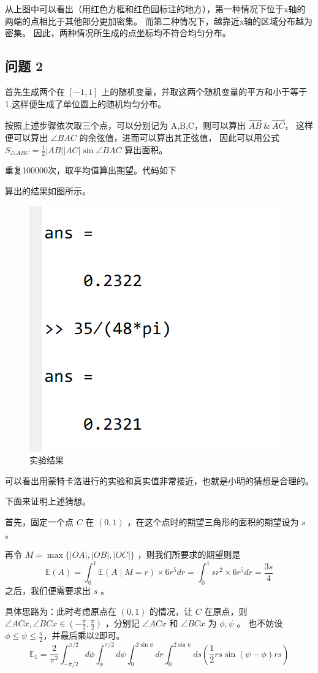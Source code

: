 \documentclass[12pt]{ctexart}
\begin{document}
从上图中可以看出（用红色方框和红色园标注的地方），第一种情况下位于x轴的两端的点相比于其他部分更加密集。
而第二种情况下，越靠近x轴的区域分布越为密集。
因此，两种情况所生成的点坐标均不符合均匀分布。

\subsection{问题 2}

首先生成两个在 $[-1,1]$ 上的随机变量，并取这两个随机变量的平方和小于等于1.这样便生成了单位圆上的随机均匀分布。

按照上述步骤依次取三个点，可以分别记为 A,B,C，则可以算出 $\vec{AB}\ \&\ \vec{AC}$，
这样便可以算出 $\angle BAC$ 的余弦值，进而可以算出其正弦值，
因此可以用公式 $S_{\triangle ABC} =\frac12 |AB||AC|\sin\angle BAC$ 算出面积。

重复100000次，取平均值算出期望。代码如下

算出的结果如图所示。

\begin{figure}[h!]
    \includegraphics[width=0.4\linewidth]{./figure/task2_1.png}
    \caption{实验结果}
\end{figure}

可以看出用蒙特卡洛进行的实验和真实值非常接近，也就是小明的猜想是合理的。

下面来证明上述猜想。

首先，固定一个点 $C$ 在 $(0,1)$ ，在这个点时的期望三角形的面积的期望设为 $s$ 。

再令 $M=\max\{|OA|,|OB|,|OC|\}$ ，则我们所要求的期望则是
\[\mathbb{E}(A)=\int_{0}^{1} \mathbb{E}(A \mid M=r) \times 6 r^{5} d r=\int_{0}^{1} s r^{2}
    \times 6 r^{5} d r=\frac{3s}{4}\]
之后，我们便需要求出 $s$ 。

具体思路为：此时考虑原点在 $(0,1)$ 的情况，让 $C$ 在原点，则
$\angle ACx,\angle BCx \in (-\frac \pi2,\frac \pi2)$ ，分别记 $\angle ACx$ 和 $\angle BCx$ 为 $\phi,\psi$ 。
也不妨设$\phi \le \psi  \le \frac \pi2$，并最后乘以2即可。
\[\mathbb{E}_{1}=\frac{2}{\pi^{2}} \int_{-\pi/2}^{\pi/2} d \phi \int_{\phi}^{\pi/2} d \psi \int_{0}^{2 \sin \phi} d r \int_{0}^{2 \sin \psi} d s\left(\frac{1}{2} r s \sin (\psi-\phi) r s\right)\]
\end{document}
